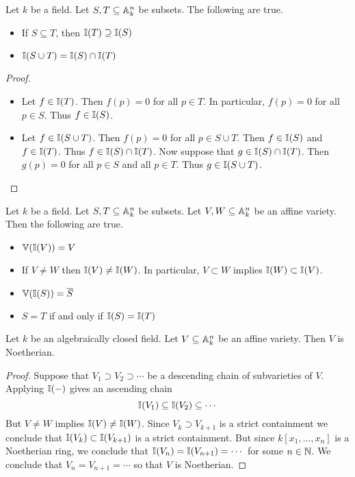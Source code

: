 \documentclass[a4paper]{article}
\begin{document}
\begin{prp}{}{} Let $k$ be a field. Let $S,T\subseteq\mathbb{A}_k^n$ be subsets. The following are true. 
\begin{itemize}
\item If $S\subseteq T$, then $\mathbb{I}(T)\supseteq\mathbb{I}(S)$
\item $\mathbb{I}(S\cup T)=\mathbb{I}(S)\cap\mathbb{I}(T)$
\end{itemize} \tcbline
\begin{proof}~\\
\begin{itemize}
\item Let $f\in\mathbb{I}(T)$. Then $f(p)=0$ for all $p\in T$. In particular, $f(p)=0$ for all $p\in S$. Thus $f\in\mathbb{I}(S)$. 
\item Let $f\in\mathbb{I}(S\cup T)$. Then $f(p)=0$ for all $p\in S\cup T$. Then $f\in\mathbb{I}(S)$ and $f\in\mathbb{I}(T)$. Thus $f\in\mathbb{I}(S)\cap\mathbb{I}(T)$. Now suppose that $g\in\mathbb{I}(S)\cap\mathbb{I}(T)$. Then $g(p)=0$ for all $p\in S$ and all $p\in T$. Thus $g\in\mathbb{I}(S\cup T)$. 
\end{itemize}
\end{proof}
\end{prp}

\begin{lmm}{}{} Let $k$ be a field. Let $S,T\subseteq\mathbb{A}_k^n$ be subsets. Let $V,W\subseteq\mathbb{A}_k^n$ be an affine variety. Then the following are true. 
\begin{itemize}
\item $\mathbb{V}(\mathbb{I}(V))=V$
\item If $V\neq W$ then $\mathbb{I}(V)\neq\mathbb{I}(W)$. In particular, $V\subset W$ implies $\mathbb{I}(W)\subset\mathbb{I}(V)$. 
\item $\mathbb{V}(\mathbb{I}(S))=\overline{S}$
\item $S=T$ if and only if $\mathbb{I}(S)=\mathbb{I}(T)$
\end{itemize}
\end{lmm}

\begin{prp}{}{} Let $k$ be an algebraically closed field. Let $V\subseteq\mathbb{A}_k^n$ be an affine variety. Then $V$ is Noetherian. \tcbline
\begin{proof}
Suppose that $V_1\supset V_2\supset\cdots$ be a descending chain of subvarieties of $V$. Applying $\mathbb{I}(-)$ gives an ascending chain $$\mathbb{I}(V_1)\subseteq\mathbb{I}(V_2)\subseteq\cdots$$ But $V\neq W$ implies $\mathbb{I}(V)\neq\mathbb{I}(W)$. Since $V_k\supset V_{k+1}$ is a strict containment we conclude that $\mathbb{I}(V_k)\subset\mathbb{I}(V_{k+1})$ is a strict containment. But since $k[x_1,\dots,x_n]$ is a Noetherian ring, we conclude that $\mathbb{I}(V_n)=\mathbb{I}(V_{n+1})=\cdots$ for some $n\in\mathbb{N}$. We conclude that $V_n=V_{n+1}=\cdots$ so that $V$ is Noetherian. 
\end{proof}
\end{prp}
\end{document}
